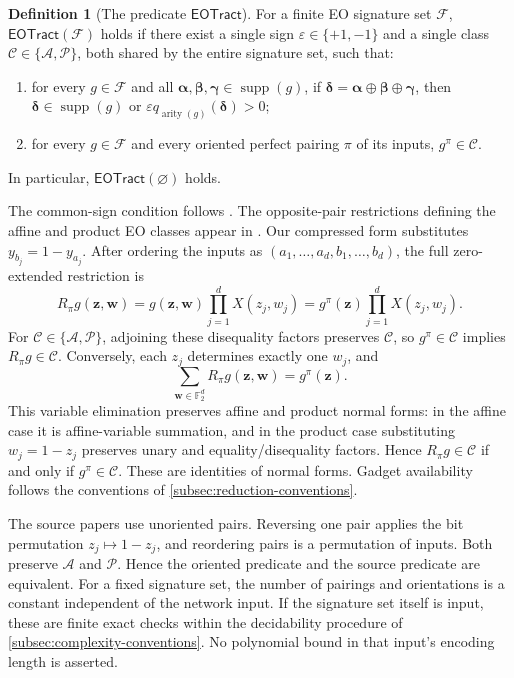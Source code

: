 \documentclass[11pt,letterpaper,onecolumn]{article}
\theoremstyle{plain}
\theoremstyle{definition}
\newtheorem{definition}[definition]{Definition}
\theoremstyle{remark}
\newcommand{\Ftwo}{\mathbb F_2}
\newcommand{\cF}{\mathcal F}
\newcommand{\cA}{\mathscr A}
\newcommand{\cP}{\mathscr P}
\newcommand{\cC}{\mathscr C}
\newcommand{\EOTract}{\mathsf{EOTract}}
\newcommand{\supp}{\operatorname{supp}}
\newcommand{\arity}{\operatorname{arity}}
\begin{document}
\begin{definition}[The predicate \(\EOTract\)]
\label{def:eo-tract}
For a finite EO signature set \(\cF\), \(\EOTract(\cF)\) holds if there exist a
single sign \(\varepsilon\in\{+1,-1\}\) and a single class
\(\cC\in\{\cA,\cP\}\), both shared by the entire signature set, such that:
\begin{enumerate}
\item for every \(g\in\cF\) and all
      \({\boldsymbol{\alpha}},{\boldsymbol{\beta}},{\boldsymbol{\gamma}}\in\supp(g)\), if
      \({\boldsymbol{\delta}}={\boldsymbol{\alpha}}\oplus{\boldsymbol{\beta}}\oplus{\boldsymbol{\gamma}}\), then
      \({\boldsymbol{\delta}}\in\supp(g)\) or
      \(\varepsilon q_{\arity(g)}({\boldsymbol{\delta}})>0\);
\item for every \(g\in\cF\) and every oriented perfect pairing \(\pi\)
      of its inputs, \(g^\pi\in\cC\).
\end{enumerate}
In particular, \(\EOTract(\varnothing)\) holds.
\end{definition}

The common-sign condition follows \cite[Theorem~26]{MengWangXia2025EO}.
The opposite-pair restrictions defining the affine and product EO classes
appear in \cite[Definition~22]{MengWangXia2024TypicalEO}.
Our compressed form substitutes \(y_{b_j}=1-y_{a_j}\).
After ordering the inputs as \((a_1,\ldots,a_d,b_1,\ldots,b_d)\), the
full zero-extended restriction is
\[
 R_\pi g({\mathbf z},{\mathbf w})
 =g({\mathbf z},{\mathbf w})\prod_{j=1}^dX(z_j,w_j)
 =g^\pi({\mathbf z})\prod_{j=1}^dX(z_j,w_j).
\]
For \(\cC\in\{\cA,\cP\}\), adjoining these disequality factors preserves
\(\cC\), so \(g^\pi\in\cC\) implies \(R_\pi g\in\cC\).
Conversely, each \(z_j\) determines exactly one \(w_j\), and
\[
 \sum_{{\mathbf w}\in\Ftwo^d}R_\pi g({\mathbf z},{\mathbf w})=g^\pi({\mathbf z}).
\]
This variable elimination preserves affine and product normal forms:
in the affine case it is affine-variable summation, and in the product
case substituting \(w_j=1-z_j\) preserves unary and equality/disequality
factors. Hence \(R_\pi g\in\cC\) if and only if \(g^\pi\in\cC\).
These are identities of normal forms. Gadget availability follows the
conventions of \cref{subsec:reduction-conventions}.

The source papers use unoriented pairs.  Reversing one pair applies the
bit permutation \(z_j\mapsto1-z_j\), and reordering pairs is a permutation of inputs. Both preserve \(\cA\) and \(\cP\).  Hence the oriented
predicate and the source predicate are equivalent.  For a fixed signature
set, the number of pairings and orientations is a constant independent of
the network input.  If the signature set itself is input, these are finite
exact checks within the decidability procedure of
\cref{subsec:complexity-conventions}. No polynomial bound in that input's
encoding length is asserted.
\end{document}
